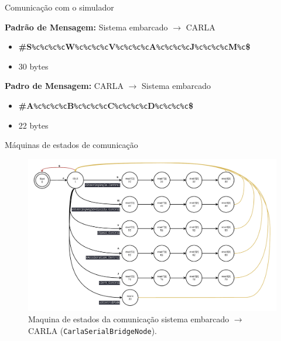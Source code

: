 \documentclass{if-beamer}
\begin{document}
\begin{frame}{Comunicação com o simulador}
\begin{block}{}
		\textbf{Padrão de Mensagem:} Sistema embarcado $\longrightarrow$ CARLA
		
		\begin{itemize}
			\item \textbf{\#S}\texttt{\%c\%c\%c\%c}\textbf{W}\texttt{\%c\%c\%c\%c}\textbf{V}\texttt{\%c\%c\%c\%c}\textbf{A}\texttt{\%c\%c\%c\%c}\textbf{J}\texttt{\%c\%c\%c\%c}\textbf{M}\texttt{\%c}\textbf{\$}
			\item 30 bytes
			
		\end{itemize}
		
		\textbf{Padro de Mensagem:} CARLA $\longrightarrow$ Sistema embarcado
		\begin{itemize}
			\item \textbf{\#A}\texttt{\%c\%c\%c\%c}\textbf{B}\texttt{\%c\%c\%c\%c}\textbf{C}\texttt{\%c\%c\%c\%c}\textbf{D}\texttt{\%c\%c\%c\%c}\textbf{\$}
			\item 22 bytes
			
		\end{itemize}
		
	\end{block}
	
\end{frame}

\begin{frame}{Máquinas de estados de comunicação}
	
	\begin{figure}[H]
		\centering
		\includegraphics[width=0.8\linewidth]{sm_uc_2_carla}
		\caption{Maquina de estados da comunicação sistema embarcado $\longrightarrow$ CARLA (\texttt{CarlaSerialBridgeNode}).}
		\label{fig:sm_uc_2_carla}
	\end{figure}
	
\end{frame}
\end{document}
